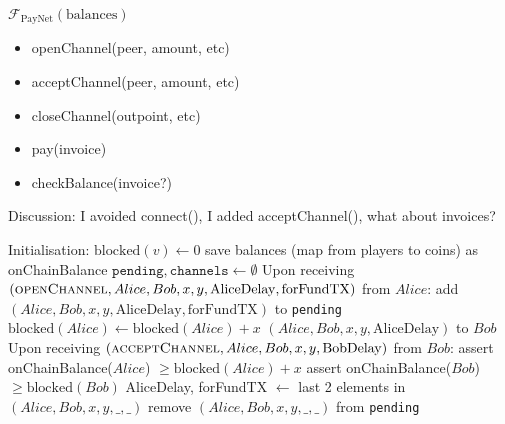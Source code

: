 \begin{functionality}{$\mathcal{F}_{\mathrm{PayNet}}
\left(\mathrm{balances}\right)$}
  \label{alg:payfunc}
    \begin{itemize}
      \item openChannel(peer, amount, etc)
      \item acceptChannel(peer, amount, etc)
      \item closeChannel(outpoint, etc)
      \item pay(invoice)
      \item checkBalance(invoice?)
    \end{itemize}
    Discussion: I avoided connect(), I added acceptChannel(), what about
    invoices?
  \begin{algorithmic}[1]
    \State Initialisation:
      \Indent
        \State $\mathrm{blocked}\left(v\right) \gets 0$
      \EndFor
      \State save balances (map from players to coins) as onChainBalance
      \State $\mathtt{pending}, \mathtt{channels} \gets \emptyset$
      \EndIndent
    \State
    \State Upon receiving $\left(\textsc{openChannel}, Alice, Bob, x, y,
    \mathrm{AliceDelay}, \mathrm{forFundTX}\right)$ from $Alice$:
    \Indent
        \State add $\left(Alice, Bob, x, y, \mathrm{AliceDelay},
        \mathrm{forFundTX}\right)$ to \texttt{pending}
        \State $\mathrm{blocked}\left(Alice\right) \leftarrow
        \mathrm{blocked}\left(Alice\right) + x$
        \State \Return $\left(Alice, Bob, x, y, \mathrm{AliceDelay}\right)$ to
        $Bob$ 
      \EndIf
    \EndIndent
    \State
    \State Upon receiving $\left(\textsc{acceptChannel}, Alice, Bob, x, y,
    \mathrm{BobDelay}\right)$ from $Bob$: 
    \Indent
        \State assert onChainBalance($Alice$) $\geq
        \mathrm{blocked}\left(Alice\right) + x$
        \State assert onChainBalance($Bob$) $\geq
        \mathrm{blocked}\left(Bob\right)$
        \State AliceDelay, forFundTX $\gets$ last 2 elements in $\left(Alice,
        Bob, x, y, \_, \_\right)$
        \State remove $\left(Alice, Bob, x, y, \_, \_\right)$ from
        \texttt{pending}

\end{algorithmic}
\end{functionality}
